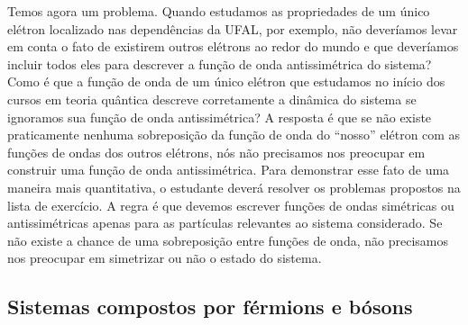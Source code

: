 \documentclass{article}
\begin{document}
Temos agora um problema. Quando estudamos as propriedades de um único elétron localizado nas dependências da UFAL, por exemplo, não deveríamos levar em conta o fato de existirem outros elétrons ao redor do mundo e que deveríamos incluir todos eles para descrever a função de onda antissimétrica do sistema? Como é que a função de onda de um único elétron que estudamos no início dos cursos em teoria quântica descreve corretamente a dinâmica do sistema se ignoramos sua função de onda antissimétrica? A resposta é que se não existe praticamente nenhuma sobreposição da função de onda do ``nosso'' elétron com as funções de ondas dos outros elétrons, nós não precisamos nos preocupar em construir uma função de onda antissimétrica. Para demonstrar esse fato de uma maneira mais quantitativa, o estudante deverá resolver os problemas propostos na lista de exercício. A regra é que devemos escrever funções de ondas simétricas ou antissimétricas apenas para as partículas relevantes ao sistema considerado. Se não existe a chance de uma sobreposição entre funções de onda, não precisamos nos preocupar em simetrizar ou não o estado do sistema.

\subsection{Sistemas compostos por férmions e bósons}
\end{document}
